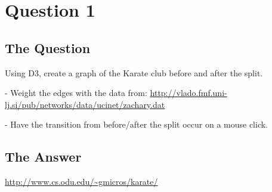 \section{Question 1}

\subsection{The Question}

\begin{flushleft}

Using D3, create a graph of the Karate club before and after
the split.

- Weight the edges with the data from: 
\url{http://vlado.fmf.uni-lj.si/pub/networks/data/ucinet/zachary.dat}

- Have the transition from before/after the split occur on a mouse
click.

\end{flushleft}
\subsection{The Answer}

\url{http://www.cs.odu.edu/~gmicros/karate/}



%
%
%






